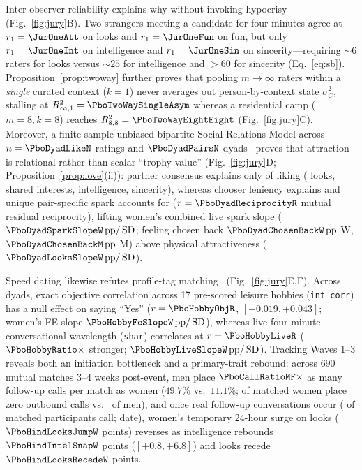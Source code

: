 Inter-observer reliability explains why without invoking hypocrisy (Fig.~\ref{fig:jury}B). Two strangers meeting a candidate for four minutes agree at $r_1=\JurOneAtt$ on looks and $r_1=\JurOneFun$ on fun, but only $r_1=\JurOneInt$ on intelligence and $r_1=\JurOneSin$ on sincerity---requiring $\sim\!6$ raters for looks versus $\sim\!25$ for intelligence and $>60$ for sincerity (Eq.~\eqref{eq:sb}). Proposition~\ref{prop:twoway} further proves that pooling $m\to\infty$ raters within a \emph{single} curated context ($k=1$) never averages out person-by-context state $\sigma_C^2$, stalling at $R^2_{\infty,1}=\PboTwoWaySingleAsym$ whereas a residential camp ($m=8,k=8$) reaches $R^2_{8,8}=\PboTwoWayEightEight$ (Fig.~\ref{fig:jury}C). Moreover, a finite-sample-unbiased bipartite Social Relations Model across $n=\PboDyadLikeN$ ratings and $\PboDyadPairsN$ dyads~\cite{eastwick2014} proves that attraction is relational rather than scalar ``trophy value'' (Fig.~\ref{fig:jury}D; Proposition~\ref{prop:love}(ii)): partner consensus explains only \PboDyadConsensusShare{} of liking (\PboDyadLooksConsensus{} looks, \PboDyadSharConsensus{} shared interests, \PboDyadIntelConsensus{} intelligence, \PboDyadSincConsensus{} sincerity), whereas chooser leniency explains \PboDyadChooserShare{} and unique pair-specific spark accounts for \PboDyadUniqueShare{} ($r=\PboDyadReciprocityR$ mutual residual reciprocity), lifting women's combined live spark slope ($\PboDyadSparkSlopeW\,\mathrm{pp}/\SD$; feeling chosen back $\PboDyadChosenBackW\,\mathrm{pp}$ W, $\PboDyadChosenBackM\,\mathrm{pp}$ M) above physical attractiveness ($\PboDyadLooksSlopeW\,\mathrm{pp}/\SD$).

Speed dating likewise refutes profile-tag matching~\cite{finkel2012,eastwick2008} (Fig.~\ref{fig:jury}E,F). Across \PboHobbyDyadsN{} dyads, exact objective correlation across 17 pre-scored leisure hobbies (\texttt{int\_corr}) has a null effect on saying ``Yes'' ($r=\PboHobbyObjR$, $[-0.019,+0.043]$; women's FE slope $\PboHobbyFeSlopeW\,\mathrm{pp}/\SD$), whereas live four-minute conversational wavelength (\texttt{shar}) correlates at $r=\PboHobbyLiveR$ ($\PboHobbyRatio\times$ stronger; $\PboHobbyLiveSlopeW\,\mathrm{pp}/\SD$). Tracking Waves 1--3 reveals both an initiation bottleneck and a primary-trait rebound: across $690$ mutual matches 3--4 weeks post-event, men place $\PboCallRatioMF\times$ as many follow-up calls per match as women ($49.7\%$ vs.\ $11.1\%$; \PboZeroCallsW{} of matched women place zero outbound calls vs.\ \PboZeroCallsM{} of men), and once real follow-up conversations occur (\PboMatchCallPct{} of matched participants call; \PboMatchDatePct{} date), women's temporary 24-hour surge on looks ($\PboHindLooksJumpW$ points) reverses as intelligence rebounds $\PboHindIntelSnapW$ points ($[+0.8,+6.8]$) and looks recede $\PboHindLooksRecedeW$ points.

